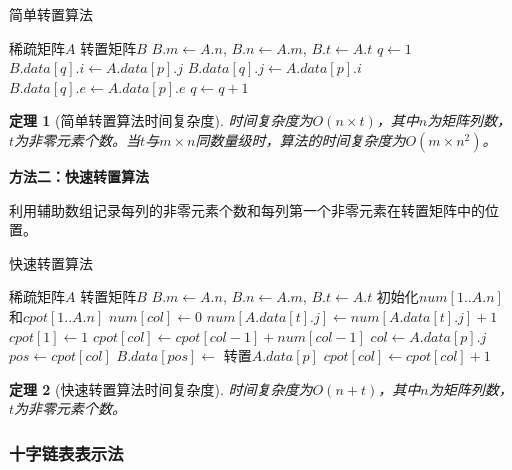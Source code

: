 \documentclass[12pt,a4paper]{amsart}
\newtheorem{theorem}{定理}[section]
\begin{document}
\begin{algorithm}[H]
\caption{简单转置算法}
\begin{algorithmic}[1]
\REQUIRE 稀疏矩阵$A$
\ENSURE 转置矩阵$B$
\STATE $B.m \leftarrow A.n$, $B.n \leftarrow A.m$, $B.t \leftarrow A.t$
\STATE $q \leftarrow 1$
            \STATE $B.data[q].i \leftarrow A.data[p].j$
            \STATE $B.data[q].j \leftarrow A.data[p].i$
            \STATE $B.data[q].e \leftarrow A.data[p].e$
            \STATE $q \leftarrow q + 1$
        \ENDIF
    \ENDFOR
\ENDFOR
\end{algorithmic}
\end{algorithm}

\begin{theorem}[简单转置算法时间复杂度]
时间复杂度为$O(n \times t)$，其中$n$为矩阵列数，$t$为非零元素个数。当$t$与$m \times n$同数量级时，算法的时间复杂度为$O(m \times n^2)$。
\end{theorem}

\textbf{方法二：快速转置算法}

利用辅助数组记录每列的非零元素个数和每列第一个非零元素在转置矩阵中的位置。

\begin{algorithm}[H]
\caption{快速转置算法}
\begin{algorithmic}[1]
\REQUIRE 稀疏矩阵$A$
\ENSURE 转置矩阵$B$
\STATE $B.m \leftarrow A.n$, $B.n \leftarrow A.m$, $B.t \leftarrow A.t$
\STATE 初始化$num[1..A.n]$和$cpot[1..A.n]$
    \STATE $num[col] \leftarrow 0$
\ENDFOR
{}
    \STATE $num[A.data[t].j] \leftarrow num[A.data[t].j] + 1$
\ENDFOR
\STATE $cpot[1] \leftarrow 1$
    \STATE $cpot[col] \leftarrow cpot[col-1] + num[col-1]$
\ENDFOR
{}
    \STATE $col \leftarrow A.data[p].j$
    \STATE $pos \leftarrow cpot[col]$
    \STATE $B.data[pos] \leftarrow$ 转置$A.data[p]$
    \STATE $cpot[col] \leftarrow cpot[col] + 1$
\ENDFOR
\end{algorithmic}
\end{algorithm}

\begin{theorem}[快速转置算法时间复杂度]
时间复杂度为$O(n + t)$，其中$n$为矩阵列数，$t$为非零元素个数。
\end{theorem}

\subsubsection{十字链表表示法}
\end{document}
